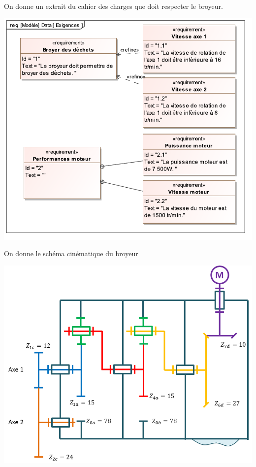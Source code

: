 \documentclass[10pt,fleqn]{article} %
\begin{document}
\begin{multicols}{2}
On donne un extrait du cahier des charges que doit respecter le broyeur.


\begin{center}
\includegraphics[width=\linewidth]{images/broyeur_06}
\end{center}

On donne le schéma cinématique du broyeur
\begin{center}
\includegraphics[width=\linewidth]{images/broyeur_05}
\end{center}


\end{multicols}
\end{document}
